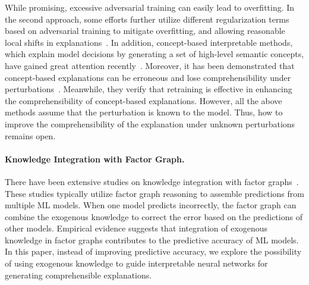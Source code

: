 While promising, excessive adversarial training can easily lead to overfitting.
In the second approach, some efforts further utilize different regularization terms based on adversarial training to mitigate overfitting, and allowing reasonable local shifts in explanations~\citep{kamath2024rethinking,Sarkar20212532,chen2019robust}.
In addition, concept-based interpretable methods, which explain model decisions by generating a set of high-level semantic concepts, have gained great attention recently~\cite{koh2020concept,havasi2022addressing,Wang2022CVPR10254}.
Moreover, it has been demonstrated that concept-based explanations can be erroneous and lose comprehensibility under perturbations~\cite{sinha2023understanding}.
Meanwhile, they verify that retraining is effective in enhancing the comprehensibility of concept-based explanations.
However, all the above methods assume that the perturbation is known to the model. Thus, how to improve the comprehensibility of the explanation under unknown perturbations remains open.

\paragraph{Knowledge Integration with Factor Graph.} 
There have been extensive studies on knowledge integration with factor graphs~\citep{10430101,gurel2021knowledge,yang2022improving}.
These studies typically utilize factor graph reasoning to assemble predictions from multiple ML models.
When one model predicts incorrectly, the factor graph can combine the exogenous knowledge to correct the error based on the predictions of other models.
Empirical evidence suggests that integration of exogenous knowledge in factor graphs contributes to the predictive accuracy of ML models.
In this paper, instead of improving predictive accuracy, we explore the possibility of using exogenous knowledge to guide interpretable neural networks for generating comprehensible explanations.